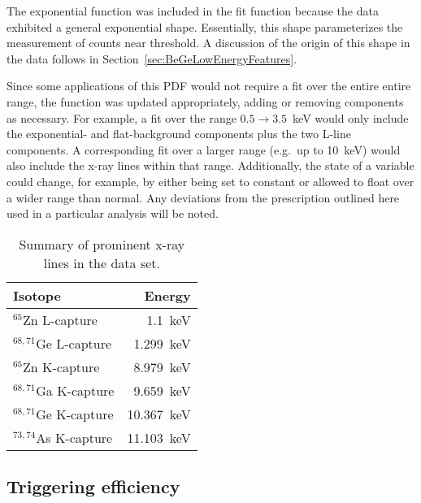 The exponential function was included in the fit function because the data exhibited a general exponential shape.  Essentially, this shape parameterizes the measurement of counts near threshold.  A discussion of the origin of this shape in the data follows in Section~\ref{sec:BeGeLowEnergyFeatures}.  

Since some applications of this PDF would not require a fit over the entire entire range, the function was updated appropriately, adding or removing components as necessary.  For example, a fit over the range $0.5\to3.5$~keV would only include the exponential- and flat-background components plus the two L-line components.  A corresponding fit over a larger range (e.g.~up to 10~keV) would also include the x-ray lines within that range.  Additionally, the state of a variable could change, for example, by either being set to constant or allowed to float over a wider range than normal.  Any deviations from the prescription outlined here used in a particular analysis will be noted.  

			\begin{table}
			\centering
				\begin{tabular}{l r}
					\toprule
					Isotope & Energy \\
					\midrule
					$^{65}$Zn L-capture & 1.1~keV \\
					$^{68,71}$Ge L-capture & 1.299~keV \\
					$^{65}$Zn K-capture & 8.979~keV \\
					$^{68,71}$Ga K-capture & 9.659~keV \\
					$^{68,71}$Ge K-capture & 10.367~keV \\
					$^{73,74}$As K-capture & 11.103~keV \\
					\bottomrule
				\end{tabular}	
				\caption[Summary of prominent x-ray lines in the BeGe data set]
				{Summary of prominent x-ray lines in the data set.}
				\label{tab:XRayLines}
			\end{table}	
	
		\subsection{Triggering efficiency}
		\label{sec:BeGeTrigEff}

